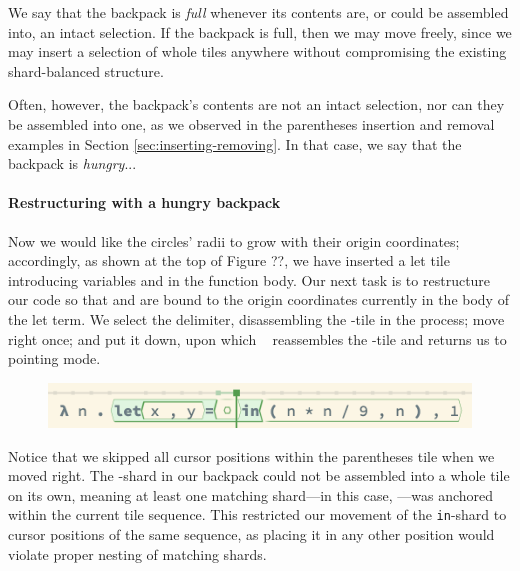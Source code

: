 
We say that the backpack is \emph{full} whenever
its contents are, or could be assembled into, an intact selection.
If the backpack is full, then we may move freely,
since we may insert a selection of whole tiles anywhere
without compromising the existing shard-balanced structure.


Often, however, the backpack's contents are not an intact
selection, nor can they be assembled into one, as we observed
in the parentheses insertion and removal examples in Section \ref{sec:inserting-removing}.
In that case, we say that the backpack is \emph{hungry}...

\paragraph{Restructuring with a hungry backpack}

Now we would like the circles' radii to grow
with their origin coordinates; accordingly,
as shown at the top of Figure ??,
we have inserted
a let tile introducing variables  and 
in the function body.
Our next task is to restructure our code so that 
and  are bound to the origin coordinates
 currently in the body of the let term.
We select the  delimiter,
disassembling the -tile in the process;
move right once; and put it down,
upon which \tylr~ reassembles the -tile
and returns us to pointing mode.

\begin{figure}[h]
  \centering
  \includegraphics[width=0.9\columnwidth]{img/placeholder-restructuring-hungry.png}
\end{figure}



Notice that we skipped all cursor positions within
the parentheses tile when we moved right.
The -shard in our backpack could not be assembled into
a whole tile on its own, meaning at least one matching shard---in
this case, ---was
anchored within the current tile sequence.
This restricted our movement of the \texttt{in}-shard
to cursor positions of the same sequence,
as placing it in any other position would
violate proper nesting of matching shards.

